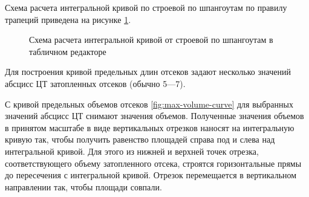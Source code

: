 Схема расчета интегральной кривой по строевой по шпангоутам по правилу трапеций приведена на рисунке \ref{fig:full-volume-byX}.
\begin{figure}
    \centering
    \footnotesize
    \caption{Схема расчета интегральной кривой от строевой по шпангоутам в табличном редакторе}
    \label{fig:full-volume-byX}
\end{figure}

Для построения кривой предельных длин отсеков задают несколько значений абсцисс ЦТ затопленных отсеков (обычно 5—7).

С кривой предельных объемов отсеков \ref{fig:max-volume-curve} для выбранных значений абсцисс ЦТ снимают значения объемов.
Полученные значения объемов в принятом масштабе в виде вертикальных отрезков наносят на интегральную кривую так, чтобы получить равенство площадей справа под и слева над интегральной кривой.
Для этого из нижней и верхней точек отрезка, соответствующего объему затопленного отсека, строятся горизонтальные прямы до пересечения с интегральной кривой.
Отрезок перемещается в вертикальном направлении так, чтобы площади совпали.

